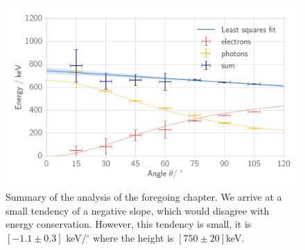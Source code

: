 \begin{figure}[htpb]
    \centering
    \includegraphics[width=0.9\linewidth]{./analysis/figures/energy_conservation}
    \caption{Summary of the analysis of the foregoing chapter. We arrive at a small tendency of a negative slope, which
    would disagree with energy conservation. However, this tendency is small, it is
    $[-1.1 \pm 0.3]$ keV/$^\circ$ where the height is $[750 \pm 20]$keV.}
\label{fig:energy_conservation}
\end{figure}
\clearpage
